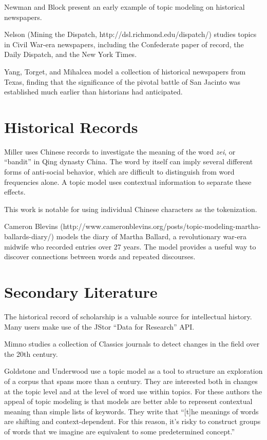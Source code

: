 Newman and Block \cite{newman-06} present an early example of topic modeling on historical newspapers.

Nelson (Mining the Dispatch, http://dsl.richmond.edu/dispatch/) studies topics in Civil War-era newspapers, including the Confederate paper of record, the Daily Dispatch, and the New York Times.

Yang, Torget, and Mihalcea \cite{yang-11-historical} model a collection of historical newspapers from Texas, finding that the significance of the pivotal battle of San Jacinto was established much earlier than historians had anticipated.

\section{Historical Records}

Miller \cite{miller-13} uses Chinese records to investigate the meaning of the word {\em zei}, or ``bandit'' in Qing dynasty China. The word by itself can imply several different forms of anti-social behavior, which are difficult to distinguish from word frequencies alone. A topic model uses contextual information to separate these effects.

This work is notable for using individual Chinese characters as the tokenization.

Cameron Blevins (http://www.cameronblevins.org/posts/topic-modeling-martha-ballards-diary/) models the diary of Martha Ballard, a revolutionary war-era midwife who recorded entries over 27 years. The model provides a useful way to discover connections between words and repeated discourses.

\section{Secondary Literature}

The historical record of scholarship is a valuable source for intellectual history. Many users make use of the JStor ``Data for Research'' API.

Mimno \cite{Mimno-12b} studies a collection of Classics journals to detect changes in the field over the 20th century.

Goldstone and Underwood \cite{Goldstone-14} use a topic model as a tool to structure an exploration of a corpus that spans more than a century.
They are interested both in changes at the topic level and at the level of word use within topics.
For these authors the appeal of topic modeling is that models are better able to represent contextual meaning than simple lists of keywords. They write that ``[t]he meanings
of words are shifting and context-dependent. For this reason, it’s risky to
construct groups of words that we imagine are equivalent to some predetermined
concept.''

